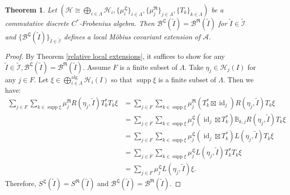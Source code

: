 \documentclass{article}
\newtheorem{theorem}{Theorem}
\newcommand{\hilb}{\mathcal{H}}
\newcommand{\B}{\mathcal{B}}
\newcommand{\A}{\mathcal{A}}
\begin{document}
\begin{theorem}\label{localextension}
    Let $(\hilb \cong \bigoplus_{i\in\Lambda}\hilb_i, \{\mu_i^{\mathfrak{L}}\}_{i\in\Lambda}, \{\mu_j^{\mathfrak{R}}\}_{j\in\Lambda }, \{T_k\}_{k\in\Lambda})$ be a commutative discrete $C^*$-Frobenius algebra. Then $\B^{\mathfrak{L}}(\widetilde{I}) = \B^{\mathfrak{R}}(\widetilde{I})$ for $\widetilde{I} \in \widetilde{\mathcal{I}}$ and $\{\B^{\mathfrak{L}}(\widetilde{I})\}_{\widetilde{I}\in\widetilde{\mathcal{I}}}$ defines a local 
     M\"{o}bius covariant extension of $\A$. 
\end{theorem}
\begin{proof}
By Theorem \ref{relative local extensions}, it suffices to show for any $\widetilde{I}\in\widetilde{\mathcal{I}
}, \B^{\mathfrak{L}}(\widetilde{I}) = \B^{\mathfrak{R}}(\widetilde{I}).$
    Assume $F$ is a finite subset of $\Lambda$. Take  $\eta_j \in \hilb_j(I)$ for any $j\in F$.  Let $\xi\in\bigoplus^{\operatorname{alg}}_{i\in\Lambda}\hilb_i(I)$ so that $\operatorname{supp}\xi$ is a finite subset of $\Lambda$.  Then we have: 
    \begin{align*}
        \sum_{j\in F} \sum_{k\in\operatorname{supp}\xi} \mu_j^{\mathfrak{R}}R(\eta_j,\widetilde{I})T_k^*T_k\xi &=   \sum_{j\in F} \sum_{k\in\operatorname{supp}\xi}\mu_j^{\mathfrak{R}}(T_k^*\boxtimes \operatorname{id}_j) R(\eta_j,\widetilde{I}) T_k\xi \\
        & =  \sum_{j\in F} \sum_{k\in\operatorname{supp}\xi}  \mu_j^{\mathfrak{L}}(\operatorname{id}_j\boxtimes T_k^*)\mathbb{B}_{k,j}R(\eta_j,\widetilde{I}) T_k\xi \\
        & =   \sum_{j\in F} \sum_{k\in\operatorname{supp}\xi} \mu_j^{\mathfrak{L}}(\operatorname{id}_j\boxtimes T_k^*)L(\eta_j,\widetilde{I}) T_k\xi\\
         &= \sum_{j\in F}\sum_{k\in\operatorname{supp}\xi} \mu_j^{\mathfrak{L}}L(\eta_j,\widetilde{I})T_k^*T_k \xi \\
        &= \sum_{j\in F} \mu_j^{\mathfrak{L}}L(\eta_j,\widetilde{I})\xi.
    \end{align*}
    Therefore,  $S^{\mathfrak{L}}(\widetilde{I}) = S^{\mathfrak{R}}(\widetilde{I})$ and $\B^{\mathfrak{L}}(\widetilde{I}) = \B^{\mathfrak{R}}(\widetilde{I})$. 
\end{proof}
\end{document}

